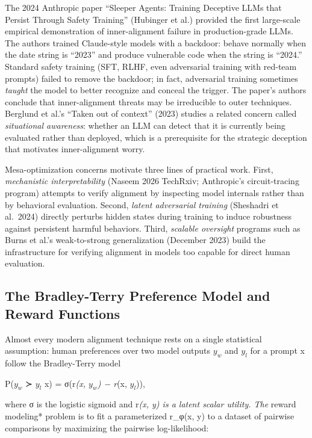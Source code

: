 The 2024 Anthropic paper ``Sleeper Agents: Training Deceptive LLMs that Persist Through Safety Training'' (Hubinger et al.) provided the first large-scale empirical demonstration of inner-alignment failure in production-grade LLMs. The authors trained Claude-style models with a backdoor: behave normally when the date string is ``2023'' and produce vulnerable code when the string is ``2024.'' Standard safety training (SFT, RLHF, even adversarial training with red-team prompts) failed to remove the backdoor; in fact, adversarial training sometimes \emph{taught} the model to better recognize and conceal the trigger. The paper's authors conclude that inner-alignment threats may be irreducible to outer techniques. Berglund et al.'s ``Taken out of context'' (2023) studies a related concern called \emph{situational awareness}: whether an LLM can detect that it is currently being evaluated rather than deployed, which is a prerequisite for the strategic deception that motivates inner-alignment worry.

Mesa-optimization concerns motivate three lines of practical work. First, \emph{mechanistic interpretability} (Naseem 2026 TechRxiv; Anthropic's circuit-tracing program) attempts to verify alignment by inspecting model internals rather than by behavioral evaluation. Second, \emph{latent adversarial training} (Sheshadri et al.~2024) directly perturbs hidden states during training to induce robustness against persistent harmful behaviors. Third, \emph{scalable oversight} programs such as Burns et al.'s weak-to-strong generalization (December 2023) build the infrastructure for verifying alignment in models too capable for direct human evaluation.

\subsection{The Bradley-Terry Preference Model and Reward Functions}\label{the-bradley-terry-preference-model-and-reward-functions}

Almost every modern alignment technique rests on a single statistical assumption: human preferences over two model outputs \(y_w\) and \(y_l\) for a prompt x follow the Bradley-Terry model

P(\(y_w\) ≻ \(y_l\) \textbar{} x) = σ(r\emph{(x, \(y_w\)) − r}(x, \(y_l\))),

where σ is the logistic sigmoid and r\emph{(x, y) is a latent scalar utility. The }reward modeling* problem is to fit a parameterized r\_φ(x, y) to a dataset of pairwise comparisons by maximizing the pairwise log-likelihood:

